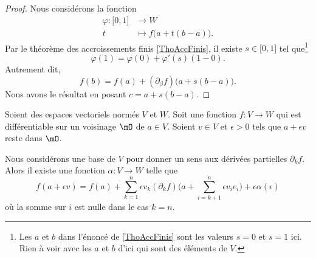 \begin{proof}
	Nous considérons la fonction
	\begin{equation}
		\begin{aligned}
			\varphi\colon \mathopen[ 0 , 1 \mathclose] & \to W                          \\
			t                                          & \mapsto f\big( a+t(b-a) \big).
		\end{aligned}
	\end{equation}
	Par le théorème des accroissements finis \ref{ThoAccFinis}, il existe \( s\in \mathopen[ 0 , 1 \mathclose]\) tel que\footnote{Les \( a\) et \( b\) dans l'énoncé de \ref{ThoAccFinis} sont les valeurs \( s=0\) et \( s=1\) ici. Rien à voir avec les \( a\) et \( b\) d'ici qui sont des éléments de \( V\).}
	\begin{equation}
		\varphi(1)=\varphi(0)+\varphi'(s)(1-0).
	\end{equation}
	Autrement dit,
	\begin{equation}
		f(b)=f(a)+(\partial_{\beta}f)\big( a+s(b-a) \big).
	\end{equation}
	Nous avons le résultat en posant \( c=a+s(b-a)\).
\end{proof}

\begin{lemma}       \label{LEMooNMTAooLgMkgH}
	Soient des espaces vectoriels normés \( V\) et \( W\). Soit une fonction \( f\colon V\to W\) qui est différentiable sur un voisinage \( \mO\) de \( a\in V\). Soient \( v\in V\) et \( \epsilon>0\) tels que \(a+\epsilon v\) reste dans \( \mO\).

	Nous considérons une base de \( V\) pour donner un sens aux dérivées partielles \( \partial_kf\). Alors il existe une fonction \( \alpha\colon V\to W\) telle que
	\begin{equation}
		f(a+\epsilon v)=f(a)+\sum_{k=1}^n\epsilon v_k (\partial_kf)\big( a+\sum_{i=k+1}^n\epsilon v_ie_i \big)+\epsilon\alpha(\epsilon)
	\end{equation}
	où la somme sur \( i\) est nulle dans le cas \( k=n\).
\end{lemma}


